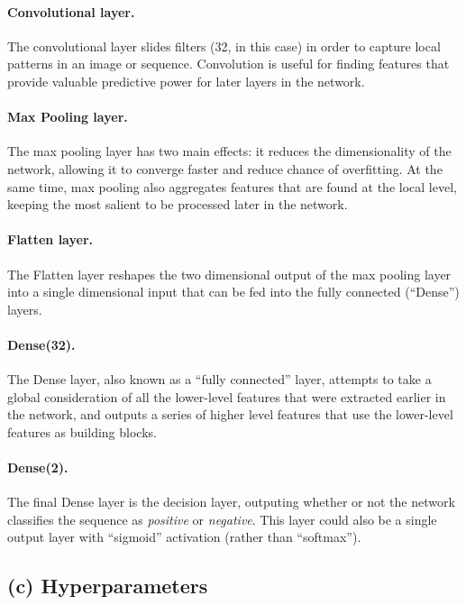 \documentclass{article}[11pt]
\begin{document}
\paragraph{Convolutional layer.} The convolutional layer slides
filters (32, in this case) in order to capture local patterns
in an image or sequence. Convolution is useful for finding
features that provide valuable predictive power for
later layers in the network.

\paragraph{Max Pooling layer.} The max pooling layer has two
main effects: it reduces the dimensionality of the network, 
allowing it to converge faster and reduce chance of overfitting.
At the same time, max pooling also aggregates features that
are found at the local level, keeping the most salient
to be processed later in the network.

\paragraph{Flatten layer.} The Flatten layer reshapes the
two dimensional output of the max pooling layer
into a single dimensional input that
can be fed into the fully connected (``Dense'') layers.

\paragraph{Dense(32).} The Dense layer, also known as a
``fully connected'' layer, attempts to take a global
consideration of all the lower-level features that were
extracted earlier in the network, and outputs a series
of higher level features that use the lower-level
features as building blocks.

\paragraph{Dense(2).} The final Dense layer is the decision
layer, outputing whether or not the network classifies
the sequence as {\it positive} or {\it negative}. This
layer could also be a single output layer with ``sigmoid''
activation (rather than ``softmax'').

\subsection*{(c) Hyperparameters}
\end{document}
